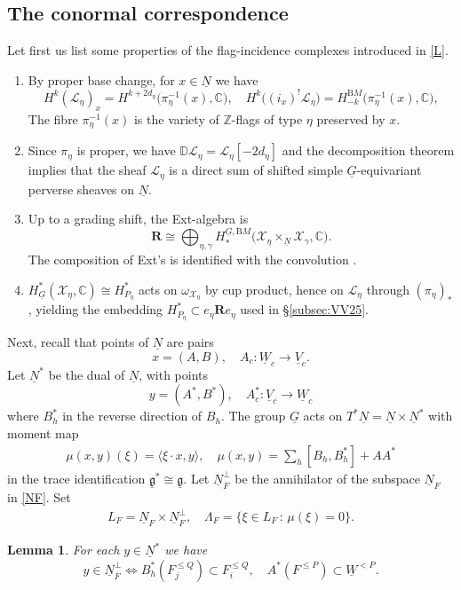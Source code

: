 \documentclass[11pt,reqno]{amsart}
\newtheorem{Lemma}[Theorem]{Lemma}
\theoremstyle{definition}
\theoremstyle{remark}
\def\bbC{\mathbb C}
\def\bbZ{\mathbb Z}
\def\dN{\underline N}
\def\dG{\underline G}
\def\dV{\underline V}
\def\dW{\underline W}
\def\dg{\underline{\mathfrak g}}
\def\scrX{\mathscr X}
\def\BM{{\mathrm BM}}
\def\bR{\mathbf R}
\begin{document}
\subsection{The conormal correspondence}
Let first us list some properties of the flag-incidence complexes introduced in \eqref{L}.
\begin{enumerate}[label=$\mathrm{(\alph*)}$,leftmargin=8mm]
\item  By proper base change, for $x\in\dN$ we have
\[
H^k(\mathscr L_\eta)_x=H^{k+2d_\eta}\big(\pi_\eta^{-1}(x),\bbC\big),\quad 
H^k\big((i_x)^!\mathscr L_\eta\big)=H^{\BM}_{-k}\big(\pi_\eta^{-1}(x),\bbC\big),
\]
The fibre $\pi_\eta^{-1}(x)$ is the  variety of $\bbZ$-flags of type $\eta$ preserved by $x$.
\item  Since $\pi_\eta$ is proper, we have
$\mathbb D\mathscr L_\eta=\mathscr L_\eta[-2d_\eta]$ and the decomposition theorem \cite{BBD82}
implies that the sheaf $\mathscr L_\eta$ is a direct sum of shifted simple $\dG$-equivariant perverse
sheaves on $\dN$.
\item 
Up to a grading shift, the Ext-algebra is 
$$\bR\cong 
\bigoplus_{\eta,\gamma}H^{\dG,\BM}_*\big(\scrX_\eta\times_{\dN}\scrX_\gamma,\bbC\big).$$ 
The composition of Ext's is identified with the convolution \cite[\S8.6]{CG97}. 
\item $H^*_{\dG}(\scrX_\eta,\bbC)\cong H^*_{P_\eta}$ acts on $\omega_{\scrX_\eta}$ by cup product, 
hence on $\mathscr L_\eta$ through $(\pi_\eta)_*$, yielding
the embedding $H^*_{P_\eta}\subset e_\eta \bR e_\eta$ used in \S\ref{subsec:VV25}.
\end{enumerate}

Next, recall that points of $\dN$ are pairs 
$$x=(A,B),\quad A_c:\dW_c\to\dV_c.$$
Let $\dN^*$ be the dual of $\dN$, with points 
$$y=(A^*,B^*),\quad A^*_c:\dV_c\to\dW_c$$ 
where $B^*_h$ in the
reverse direction of $B_h$. The group $\dG$ acts on 
$T^*\dN=\dN\times\dN^*$ with moment map 
\begin{align}\label{mu}\mu(x,y)(\xi)=\langle\xi\cdot x,y\rangle,\quad \mu(x,y)=\sum_h[B_h,B_h^*]+AA^*\end{align}
in the trace identification $\dg^*\cong\dg$.
Let $\dN_F^\perp$ be the annihilator of the subspace $\dN_F$ in \eqref{NF}. Set
\begin{align}\label{LF}L_F=\dN_F\times\dN_F^\perp
,\quad
\Lambda_F=\{\xi\in L_F\,:\,\mu(\xi)=0\}.\end{align}

\begin{Lemma}\label{lem:NFperp}
For each $y\in\dN^*$ we have
\begin{equation}\label{eq:NFperp}
y\in\dN_F^\perp\iff
B_h^*(F_j^{\leqslant Q})\subset F_i^{\leqslant Q},\quad A^*(F^{\leqslant P})\subset\dW^{<P}.
\end{equation}
\end{Lemma}
\end{document}
